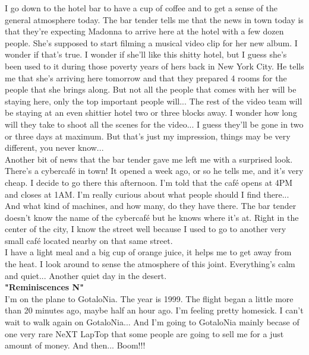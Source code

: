 \documentclass[11pt,twoside,a4paper]{book}
\begin{document}
\begin{multicols*}{2}
I go down to the hotel bar to have a cup of coffee and to get a sense of the general atmosphere today. The bar tender tells me that the news in town today is that they're expecting Madonna to arrive here at the hotel with a few dozen people. She's supposed to start filming a musical video clip for her new album. I wonder if that's true. I wonder if she'll like this shitty hotel, but I guess she's been used to it during those poverty years of hers back in New York City. He tells me that she's arriving here tomorrow and that they prepared 4 rooms for the people that she brings along. But not all the people that comes with her will be staying here, only the top important people will... The rest of the video team will be staying at an even shittier hotel two or three blocks away. I wonder how long will they take to shoot all the scenes for the video... I guess they'll be gone in two or three days at maximum. But that's just my impression, things may be very different, you never know... ~\\

Another bit of news that the bar tender gave me left me with a surprised look. There's a cybercaf{\'e} in town! It opened a week ago, or so he tells me, and it's very cheap. I decide to go there this afternoon. I'm told that the caf{\'e} opens at 4PM and closes at 1AM. I'm really curious about what people should I find there... And what kind of machines, and how many, do they have there. The bar tender doesn't know the name of the cybercaf{\'e} but he knows where it's at. Right in the center of the city, I know the street well because I used to go to another very small caf{\'e} located nearby on that same street. ~\\

I have a light meal and a big cup of orange juice, it helps me to get away from the heat. I look around to sense the atmosphere of this joint. Everything's calm and quiet... Another quiet day in the desert. ~\\


\textbf{"Reminiscences N"} ~\\

I'm on the plane to GotaloNia. The year is 1999. The flight began a little more than 20 minutes ago, maybe half an hour ago. I'm feeling pretty homesick. I can't wait to walk again on GotaloNia... And I'm going to GotaloNia mainly becase of one very rare NeXT LapTop that some people are going to sell me for a just amount of money. And then... Boom!!! ~\\


\end{multicols*}
\end{document}
